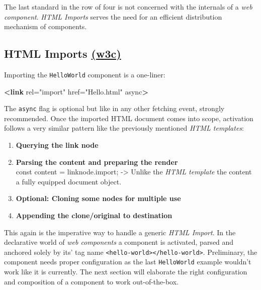 \documentclass[]{assets/latex/ieee}
\newenvironment{Shaded}{}{}
\newcommand{\KeywordTok}[1]{\textcolor[rgb]{0.00,0.44,0.13}{\textbf{{#1}}}}
\newcommand{\StringTok}[1]{\textcolor[rgb]{0.25,0.44,0.63}{{#1}}}
\newcommand{\OtherTok}[1]{\textcolor[rgb]{0.00,0.44,0.13}{{#1}}}
\begin{document}
The last standard in the row of four is not concerned with the internals
of a \emph{web component}. \emph{HTML Imports} serves the need for an
efficient distribution mechanism of components.

\subsection{\texorpdfstring{HTML Imports
\href{https://www.w3.org/TR/html-imports/}{(w3c)}}{HTML Imports (w3c)}}\label{html-imports-w3c}

Importing the \texttt{HelloWorld} component is a one-liner:

\begin{Shaded}
\begin{Highlighting}[]
\KeywordTok{<link}\OtherTok{ rel=}\StringTok{"import"}\OtherTok{ href=}\StringTok{"Hello.html"}\OtherTok{ async}\KeywordTok{>}
\end{Highlighting}
\end{Shaded}

The \texttt{async} flag is optional but like in any other fetching
event, strongly recommended. Once the imported HTML document comes into
scope, activation follows a very similar pattern like the previously
mentioned \emph{HTML templates}:

\begin{enumerate}
\def\labelenumi{\arabic{enumi}.}
\item
  \textbf{Querying the link node}
\item
  \textbf{Parsing the content and preparing the render}\\
  const content = linknode.import; -\textgreater{} Unlike the \emph{HTML
  template} the content a fully equipped document object.
\item
  \textbf{Optional: Cloning some nodes for multiple use}
\item
  \textbf{Appending the clone/original to destination}
\end{enumerate}

This again is the imperative way to handle a generic \emph{HTML Import}.
In the declarative world of \emph{web components} a component is
activated, parsed and anchored solely by its' tag name
\texttt{\textless{}hello-world\textgreater{}\textless{}/hello-world\textgreater{}}.
Preliminary, the component needs proper configuration as the last
\texttt{HelloWorld} example wouldn't work like it is currently. The next
section will elaborate the right configuration and composition of a
component to work out-of-the-box.
\end{document}
